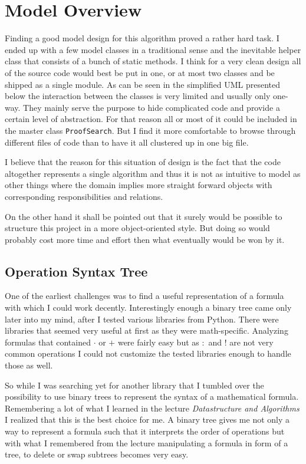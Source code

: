 \section{Model Overview}
Finding a good model design for this algorithm proved a rather hard task. I ended up with a few model classes in a traditional sense and the inevitable helper class that consists of a bunch of static methods. I think for a very clean design all of the source code would best be put in one, or at most two classes and be shipped as a single module. As can be seen in the simplified UML presented below the interaction between the classes is very limited and usually only one-way. They mainly serve the purpose to hide complicated code and provide a certain level of abstraction. For that reason all or most of it could be included in the master class \texttt{ProofSearch}. But I find it more comfortable to browse through different files of code than to have it all clustered up in one big file.

I believe that the reason for this situation of design is the fact that the code altogether represents a single algorithm and thus it is not as intuitive to model as other things where the domain implies more straight forward objects with corresponding responsibilities and relations.

On the other hand it shall be pointed out that it surely would be possible to structure this project in a more object-oriented style. But doing so would probably cost more time and effort then what eventually would be won by it.

\subsection{Operation Syntax Tree}
One of the earliest challenges was to find a useful representation of a formula with which I could work decently. Interestingly enough a binary tree came only later into my mind, after I tested various libraries from Python. There were libraries that seemed very useful at first as they were math-specific. Analyzing formulas that contained $\cdot$ or $+$ were fairly easy but as $:$ and $!$ are not very common operations I could not customize the tested libraries enough to handle those as well.

So while I was searching yet for another library that I tumbled over the possibility to use binary trees to represent the syntax of a mathematical formula. Remembering a lot of what I learned in the lecture \emph{Datastructure and Algorithms} I realized that this is the best choice for me. A binary tree gives me not only a way to represent a formula such that it interprets the order of operations but with what I remembered from the lecture manipulating a formula in form of a tree, to delete or swap subtrees becomes very easy. 

